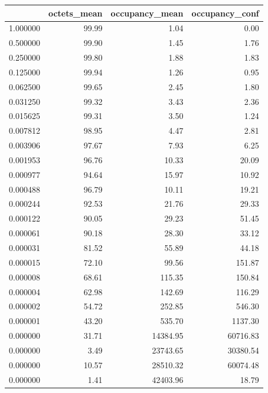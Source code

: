 \begin{tabular}{lrrr}
\toprule
 & octets_mean & occupancy_mean & occupancy_conf \\
\midrule
1.000000 & 99.99 & 1.04 & 0.00 \\
0.500000 & 99.90 & 1.45 & 1.76 \\
0.250000 & 99.80 & 1.88 & 1.83 \\
0.125000 & 99.94 & 1.26 & 0.95 \\
0.062500 & 99.65 & 2.45 & 1.80 \\
0.031250 & 99.32 & 3.43 & 2.36 \\
0.015625 & 99.31 & 3.50 & 1.24 \\
0.007812 & 98.95 & 4.47 & 2.81 \\
0.003906 & 97.67 & 7.93 & 6.25 \\
0.001953 & 96.76 & 10.33 & 20.09 \\
0.000977 & 94.64 & 15.97 & 10.92 \\
0.000488 & 96.79 & 10.11 & 19.21 \\
0.000244 & 92.53 & 21.76 & 29.33 \\
0.000122 & 90.05 & 29.23 & 51.45 \\
0.000061 & 90.18 & 28.30 & 33.12 \\
0.000031 & 81.52 & 55.89 & 44.18 \\
0.000015 & 72.10 & 99.56 & 151.87 \\
0.000008 & 68.61 & 115.35 & 150.84 \\
0.000004 & 62.98 & 142.69 & 116.29 \\
0.000002 & 54.72 & 252.85 & 546.30 \\
0.000001 & 43.20 & 535.70 & 1137.30 \\
0.000000 & 31.71 & 14384.95 & 60716.83 \\
0.000000 & 3.49 & 23743.65 & 30380.54 \\
0.000000 & 10.57 & 28510.32 & 60074.48 \\
0.000000 & 1.41 & 42403.96 & 18.79 \\
\bottomrule
\end{tabular}
